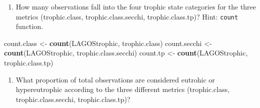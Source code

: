 \documentclass[]{article}
\newenvironment{Shaded}{\begin{snugshade}}{\end{snugshade}}
\newcommand{\CommentTok}[1]{\textcolor[rgb]{0.56,0.35,0.01}{\textit{#1}}}
\newcommand{\DataTypeTok}[1]{\textcolor[rgb]{0.13,0.29,0.53}{#1}}
\newcommand{\DecValTok}[1]{\textcolor[rgb]{0.00,0.00,0.81}{#1}}
\newcommand{\KeywordTok}[1]{\textcolor[rgb]{0.13,0.29,0.53}{\textbf{#1}}}
\newcommand{\NormalTok}[1]{#1}
\newcommand{\OperatorTok}[1]{\textcolor[rgb]{0.81,0.36,0.00}{\textbf{#1}}}
\newcommand{\StringTok}[1]{\textcolor[rgb]{0.31,0.60,0.02}{#1}}
\providecommand{\tightlist}{%
  \setlength{\itemsep}{0pt}\setlength{\parskip}{0pt}}
\begin{document}
\begin{Shaded}
\end{Shaded}

\begin{enumerate}
\def\labelenumi{\arabic{enumi}.}
\setcounter{enumi}{5}
\tightlist
\item
  How many observations fall into the four trophic state categories for
  the three metrics (trophic.class, trophic.class.secchi,
  trophic.class.tp)? Hint: \texttt{count} function.
\end{enumerate}

\begin{Shaded}
\begin{Highlighting}[]
\NormalTok{count.class <-}\StringTok{ }\KeywordTok{count}\NormalTok{(LAGOStrophic, trophic.class)}
\NormalTok{count.secchi <-}\StringTok{ }\KeywordTok{count}\NormalTok{(LAGOStrophic, trophic.class.secchi)}
\NormalTok{count.tp <-}\StringTok{ }\KeywordTok{count}\NormalTok{(LAGOStrophic, trophic.class.tp)}
\end{Highlighting}
\end{Shaded}

\begin{enumerate}
\def\labelenumi{\arabic{enumi}.}
\setcounter{enumi}{6}
\tightlist
\item
  What proportion of total observations are considered eutrohic or
  hypereutrophic according to the three different metrics
  (trophic.class, trophic.class.secchi, trophic.class.tp)?
\end{enumerate}

\begin{Shaded}
\end{Shaded}
\end{document}
